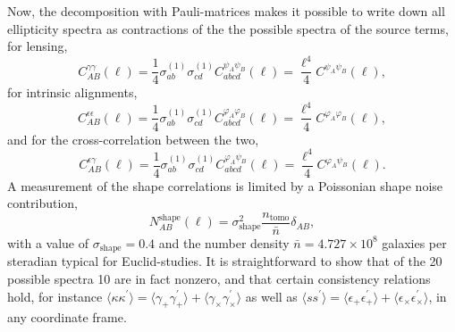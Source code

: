 \documentclass[a4paper,fleqn,usenatbib]{mnras}
\newcommand{\bra}{\langle}
\newcommand{\ket}{\rangle}
\begin{document}
Now, the decomposition with Pauli-matrices makes it possible to write down all ellipticity spectra as contractions of the the possible spectra of the source terms, for lensing,
\begin{equation}
C^{\gamma\gamma}_{AB}(\ell) = \frac{1}{4}\sigma^{(1)}_{ab}\sigma^{(1)}_{cd}C^{\psi_A\psi_B}_{abcd}(\ell) = \frac{\ell^4}{4}C^{\psi_A\psi_B}(\ell),
\end{equation}
for intrinsic alignments,
\begin{equation}
C^{\epsilon\epsilon}_{AB}(\ell) = \frac{1}{4}\sigma^{(1)}_{ab}\sigma^{(1)}_{cd}C^{\varphi_A\varphi_B}_{abcd}(\ell) = \frac{\ell^4}{4}C^{\varphi_A\varphi_B}(\ell),
\end{equation}
and for the cross-correlation between the two,
\begin{equation}
C^{\epsilon\gamma}_{AB}(\ell) = \frac{1}{4}\sigma^{(1)}_{ab}\sigma^{(1)}_{cd}C^{\varphi_A\psi_B}_{abcd}(\ell) = \frac{\ell^4}{4}C^{\varphi_A\psi_B}(\ell).
\end{equation}
A measurement of the shape correlations is limited by a Poissonian shape noise contribution,
\begin{equation}
N_{AB}^\mathrm{shape}(\ell) = \sigma^2_\mathrm{shape}\frac{n_\mathrm{tomo}}{\bar{n}}\delta_{AB},
\end{equation}
with a value of $\sigma_\mathrm{shape} = 0.4$ and the number density $\bar{n} = 4.727\times 10^8$ galaxies per steradian typical for Euclid-studies. It is straightforward to show that of the 20 possible spectra 10 are in fact nonzero, and that certain consistency relations hold, for instance $\bra\kappa\kappa^\prime\ket = \bra\gamma_+\gamma_+^\prime\ket + \bra\gamma_\times\gamma_\times^\prime\ket$ as well as $\bra ss^\prime\ket = \bra\epsilon_+\epsilon_+^\prime\ket + \bra\epsilon_\times\epsilon_\times^\prime\ket$, in any coordinate frame.
\end{document}

